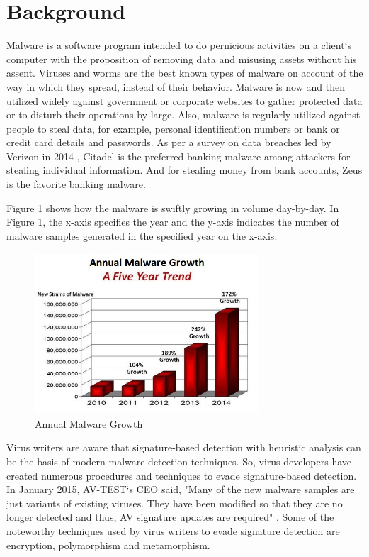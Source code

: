 \chapter{Background}

Malware is a software program intended to do pernicious activities on a client`s computer with the proposition of removing data and misusing assets without his assent. Viruses and worms are the best known types of malware on account of the way in which they spread, instead of their behavior. Malware is now and then utilized widely against government or corporate websites to gather protected data or to disturb their operations by large. Also, malware is regularly utilized against people to steal data, for example, personal identification numbers or bank or credit card details and passwords. As per a survey on data breaches led by Verizon in 2014 \cite{bib9}, Citadel is the preferred banking malware among attackers for stealing individual information. And for stealing money from bank accounts, Zeus is the favorite banking malware.

Figure 1 shows how the malware is swiftly growing in volume day-by-day. In Figure 1, the x-axis specifies the year and the y-axis indicates the number of malware samples generated in the specified year on the x-axis.

\begin{figure}
    \centering    
    \includegraphics[width=8.4cm, height=6cm]{malware-growth-chart.jpg}
    \caption[Annual Malware Growth]{Annual Malware Growth \cite{bib10}}
\end{figure}
Virus writers are aware that signature-based detection with heuristic analysis can be the basis of modern malware detection techniques. So, virus developers have created numerous procedures and techniques to evade signature-based detection. In January 2015, AV-TEST`s CEO said, "Many of the new malware samples are just variants of existing viruses. They have been modified so that they are no longer detected and thus, AV signature updates are required" \cite{bib10}. Some of the noteworthy techniques used by virus writers to evade signature detection are encryption, polymorphism and metamorphism.

